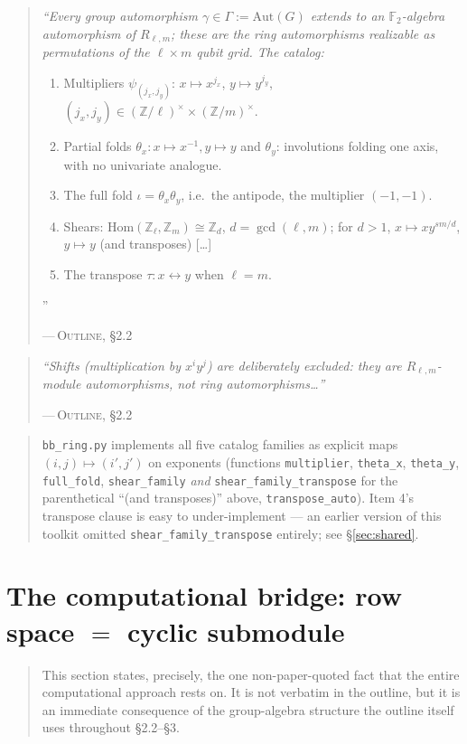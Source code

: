 \documentclass[11pt]{article}
\theoremstyle{plain}
\theoremstyle{definition}
\newenvironment{paperquote}[1]{%
  \def\paperquotecite{#1}%
  \begin{quotation}\noindent\itshape\small
}{%
  \normalfont\par\hfill---\,\textsc{Outline}, \paperquotecite\medskip
  \end{quotation}
}
\newcommand{\pq}[2]{\begin{paperquote}{#1}#2\end{paperquote}}
\newenvironment{mynote}{%
  \begin{quotation}\noindent\small
}{%
  \end{quotation}
}
\begin{document}
\pq{\S2.2}{%
``Every group automorphism $\gamma\in\Gamma:=\mathrm{Aut}(G)$ extends to an
$\mathbb{F}_2$-algebra automorphism of $R_{\ell,m}$; these are the ring
automorphisms realizable as permutations of the $\ell\times m$ qubit grid.
The catalog:
\begin{enumerate}[label=\arabic*.,itemsep=2pt]
\item Multipliers $\psi_{(j_x,j_y)}$: $x\mapsto x^{j_x}$, $y\mapsto
  y^{j_y}$, $(j_x,j_y)\in(\mathbb{Z}/\ell)^\times\times(\mathbb{Z}/m)^\times$.
\item Partial folds $\theta_x: x\mapsto x^{-1}, y\mapsto y$ and $\theta_y$:
  involutions folding one axis, with no univariate analogue.
\item The full fold $\iota=\theta_x\theta_y$, i.e.\ the antipode, the
  multiplier $(-1,-1)$.
\item Shears: $\mathrm{Hom}(\mathbb{Z}_\ell,\mathbb{Z}_m)\cong\mathbb{Z}_d$,
  $d=\gcd(\ell,m)$; for $d>1$, $x\mapsto xy^{sm/d}$, $y\mapsto y$ (and
  transposes) [\ldots]
\item The transpose $\tau: x\leftrightarrow y$ when $\ell=m$.
\end{enumerate}''
}

\pq{\S2.2}{%
``Shifts (multiplication by $x^iy^j$) are deliberately excluded: they are
$R_{\ell,m}$-module automorphisms, not ring automorphisms\ldots''
}

\begin{mynote}
\texttt{bb\_ring.py} implements all five catalog families as explicit maps
$(i,j)\mapsto(i',j')$ on exponents (functions \texttt{multiplier},
\texttt{theta\_x}, \texttt{theta\_y}, \texttt{full\_fold},
\texttt{shear\_family} \emph{and} \texttt{shear\_family\_transpose} for the
parenthetical ``(and transposes)'' above, \texttt{transpose\_auto}).
Item 4's transpose clause is easy to under-implement --- an earlier version
of this toolkit omitted \texttt{shear\_family\_transpose} entirely; see
\S\ref{sec:shared}.
\end{mynote}

\section{The computational bridge: row space $=$ cyclic submodule}
\label{sec:bridge}

\begin{mynote}
This section states, precisely, the one non-paper-quoted fact that the
entire computational approach rests on. It is not verbatim in the outline,
but it is an immediate consequence of the group-algebra structure the
outline itself uses throughout \S2.2--\S3.
\end{mynote}
\end{document}
